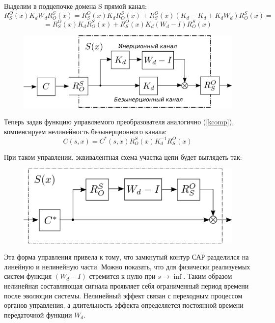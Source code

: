 \documentclass[a4paper]{article}
\begin{document}
Выделим в подцепочке домена S прямой канал:
\begin{equation*} 
R_S^O(x) K_d W_d R_O^S(x) = R_S^O(x) K_d R_O^S(x) + R_S^O(x) (K_d - K_d + K_d W_d) R_O^S(x) = 
\end{equation*}
\begin{equation} 
=R_S^O(x) K_d R_O^S(x) + R_S^O(x) K_d (W_d - I) R_O^S(x) 
\end{equation}

{
\begin{figure}[H]
\centering
\includegraphics{./src/sheme2.png}
\end{figure}
}

Теперь задав функцию управляемого преобразователя аналогично (\ref{kcomp}), компенсируем нелинейность безынерционного канала:
\begin{equation} C(s,x) = C^*(s,x) R_O^S(x) K_{d}^{-1} R_S^O(x) \end{equation}

При таком управлении, эквивалентная схема участка цепи будет выглядеть так:
{
\begin{figure}[H]
\centering
\includegraphics{./src/sheme3.png}
\end{figure}
}

Эта форма управления привела к тому, что замкнутый контур САР разделился на линейную и нелинейную части.
Можно показать, что для физически реализуемых систем функция $(W_d - I)$ стремится к нулю при $s \rightarrow \inf$. Таким образом нелинейная составляющая сигнала проявляет себя ограниченный период времени после эволюции системы. Нелинейный эффект связан с переходным процессом органов управления, а длительность эффекта определяется постоянной времени передаточной функции $W_d$.
\end{document}

